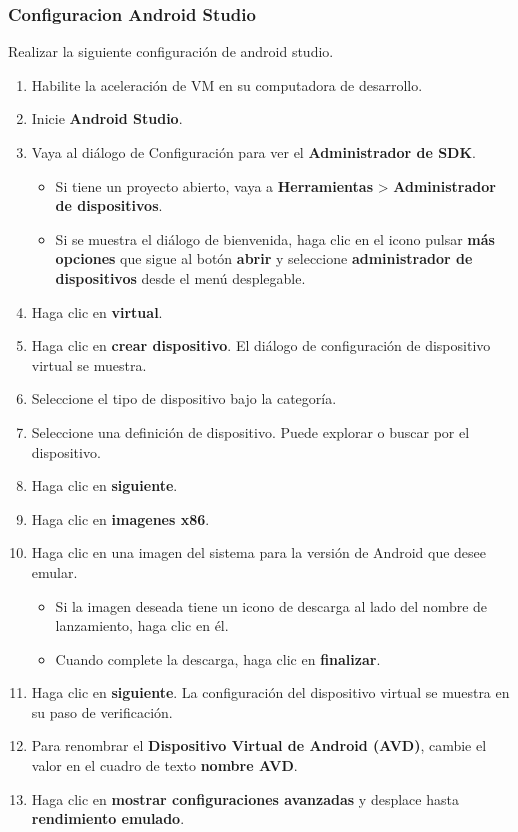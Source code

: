 \subsubsection{Configuracion Android Studio}
Realizar la siguiente configuración de android studio.
\begin{enumerate}
	\item Habilite la aceleración de VM en su computadora de desarrollo.
	\item Inicie \textbf{Android Studio}.
	\item Vaya al diálogo de Configuración para ver el \textbf{Administrador de SDK}.
	\begin{itemize}
		\item Si tiene un proyecto abierto, vaya a \textbf{Herramientas} > \textbf{Administrador de dispositivos}.
		\item Si se muestra el diálogo de bienvenida, haga clic en el icono pulsar \textbf{más opciones} que sigue al botón \textbf{abrir} y seleccione \textbf{administrador de dispositivos} desde el menú desplegable.
	\end{itemize}
	\item Haga clic en \textbf{virtual}.
	\item Haga clic en \textbf{crear dispositivo}. El diálogo de configuración de dispositivo virtual se muestra.
	\item Seleccione el tipo de dispositivo bajo la categoría.
	\item Seleccione una definición de dispositivo. Puede explorar o buscar por el dispositivo.
	\item Haga clic en \textbf{siguiente}.
	\item Haga clic en \textbf{imagenes x86}.
	\item Haga clic en una imagen del sistema para la versión de Android que desee emular.
	\begin{itemize}
		\item Si la imagen deseada tiene un icono de descarga al lado del nombre de lanzamiento, haga clic en él.
		 \item Cuando complete la descarga, haga clic en \textbf{finalizar}.
	\end{itemize}
	\item Haga clic en \textbf{siguiente}. La configuración del dispositivo virtual se muestra en su paso de verificación.
	\item Para renombrar el \textbf{Dispositivo Virtual de Android (AVD)}, cambie el valor en el cuadro de texto \textbf{nombre AVD}.
	\item Haga clic en \textbf{mostrar configuraciones avanzadas} y desplace hasta \textbf{rendimiento emulado}.

\end{enumerate}
